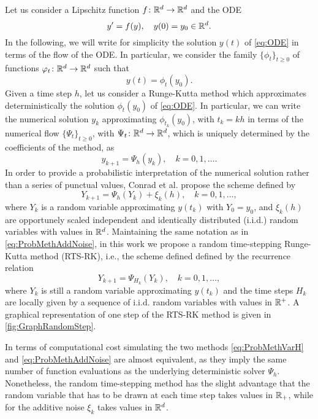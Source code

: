 \documentclass[10pt]{article}
\begin{document}
Let us consider a Lipschitz function $f\colon\mathbb{R}^d\to\mathbb{R}^d$ and the ODE
\begin{equation}\label{eq:ODE}
	y' = f(y), \quad y(0) = y_0 \in \mathbb{R}^d.
\end{equation}
In the following, we will write for simplicity the solution $y(t)$ of \eqref{eq:ODE} in terms of the flow of the ODE. In particular, we consider the family  $\{\phi_t\}_{t \geq 0}$ of functions $\varphi_t\colon\mathbb{R}^d\to\mathbb{R}^d$ such that 
\begin{equation}
	y(t) = \phi_t(y_0).
\end{equation}
Given a time step $h$, let us consider a Runge-Kutta method which approximates deterministically the solution $\phi_t(y_0)$ of \eqref{eq:ODE}. In particular, we can write the numerical solution $y_k$ approximating $\phi_{t_k}(y_0)$, with $t_k = kh$ in terms of the numerical flow $\{\Psi_t\}_{t \geq 0}$, with $\Psi_t\colon\mathbb{R}^d\to\mathbb{R}^d$, which is uniquely determined by the coefficients of the method, as
\begin{equation}
	y_{k+1} = \Psi_h(y_k), \quad k = 0, 1, \ldots.
\end{equation}
In order to provide a probabilistic interpretation of the numerical solution rather than a series of punctual values, Conrad et al. propose the scheme defined by
\begin{equation}\label{eq:ProbMethAddNoise}
	Y_{k+1} = \Psi_h(Y_{k}) + \xi_k(h), \quad k = 0, 1, \ldots,
\end{equation}
where $Y_k$ is a random variable approximating $y(t_k)$ with $Y_0 = y_0$, and $\xi_k(h)$ are opportunely scaled independent and identically distributed (i.i.d.) random variables with values in $\mathbb{R}^d$. Maintaining the same notation as in \eqref{eq:ProbMethAddNoise}, in this work we propose a random time-stepping Runge-Kutta method (RTS-RK), i.e., the scheme defined defined by the recurrence relation
\begin{equation}\label{eq:ProbMethVarH}
	Y_{k+1} = \Psi_{H_k}(Y_k), \quad k = 0, 1, \ldots,
\end{equation}
where $Y_k$ is still a random variable approximating $y(t_k)$ and the time steps $H_k$ are locally given by a sequence  of i.i.d. random variables with values in $\mathbb{R}^+$. A graphical representation of one step of the RTS-RK method is given in \cref{fig:GraphRandomStep}.
\begin{remark} In terms of computational cost simulating the two methods \eqref{eq:ProbMethVarH} and \eqref{eq:ProbMethAddNoise} are almost equivalent, as they imply the same number of function evaluations as the underlying deterministic solver $\Psi_h$. Nonetheless, the random time-stepping method has the slight advantage that the random variable that has to be drawn at each time step takes values in $\mathbb{R}_+$, while for the additive noise $\xi_k$ takes values in $\mathbb{R}^d$.
\end{remark}
\end{document}
